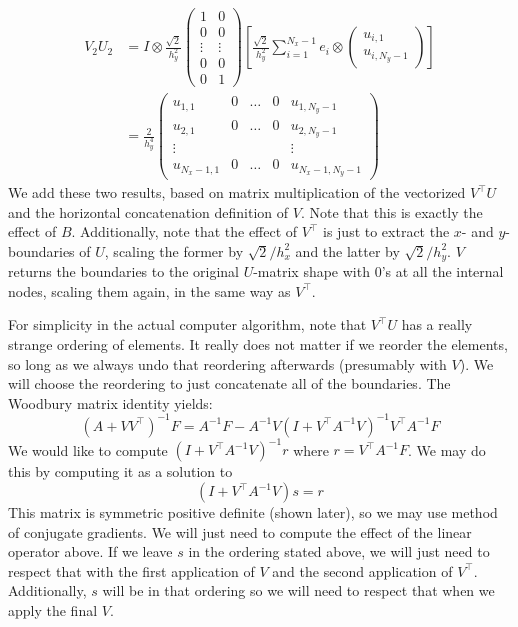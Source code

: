\documentclass[reqno]{article}
\begin{document}
	\begin{equation}
	\begin{split}
		V_2 U_2 &= I\otimes
		\frac{\sqrt{2}}{h_y^2}
		\begin{pmatrix}
			1 &0 \\
			0 &0 \\
			\vdots &\vdots \\
			0 &0 \\
			0 &1
		\end{pmatrix}
		\left[
		\frac{\sqrt{2}}{h_y^2}
		\sum_{i = 1}^{N_x - 1} e_i \otimes
		\begin{pmatrix}
			u_{i, 1} \\
			u_{i, N_y - 1}
		\end{pmatrix}
		\right] \\
		&= \frac{2}{h_y^4}
		\begin{pmatrix}
			u_{1, 1} &0 &\ldots &0 &u_{1, N_y - 1} \\
			u_{2, 1} &0 &\ldots &0 &u_{2, N_y - 1} \\
			\vdots & & & &\vdots \\
			u_{N_x - 1, 1} &0 &\ldots &0 &u_{N_x - 1, N_y - 1}
		\end{pmatrix}
	\end{split}
	\end{equation}
	We add these two results, based on matrix multiplication of the vectorized $V^\top U$ and the horizontal concatenation definition of $V$. Note that this is exactly the effect of $B$. Additionally, note that the effect of $V^\top$ is just to extract the $x$- and $y$-boundaries of $U$, scaling the former by $\sqrt{2}/h_x^2$ and the latter by $\sqrt{2}/h_y^2$. $V$ returns the boundaries to the original $U$-matrix shape with $0$'s at all the internal nodes, scaling them again, in the same way as $V^\top$. 
	
	For simplicity in the actual computer algorithm, note that $V^\top U$ has a really strange ordering of elements. It really does not matter if we reorder the elements, so long as we always undo that reordering afterwards (presumably with $V$). We will choose the reordering to just concatenate all of the boundaries. The Woodbury matrix identity yields:
	\begin{equation}
		(A + VV^\top)^{-1} F = A^{-1} F -
		A^{-1} V (I + V^\top A^{-1} V)^{-1} V^\top A^{-1} F
	\end{equation}
	We would like to compute $(I + V^\top A^{-1} V)^{-1}r$ where $r = V^\top A^{-1} F$. We may do this by computing it as a solution to
	\begin{equation}
		(I + V^\top A^{-1} V) s = r
	\end{equation}
	This matrix is symmetric positive definite (shown later), so we may use method of conjugate gradients. We will just need to compute the effect of the linear operator above. If we leave $s$ in the ordering stated above, we will just need to respect that with the first application of $V$ and the second application of $V^\top$. Additionally, $s$ will be in that ordering so we will need to respect that when we apply the final $V$. 
	
\end{document}
